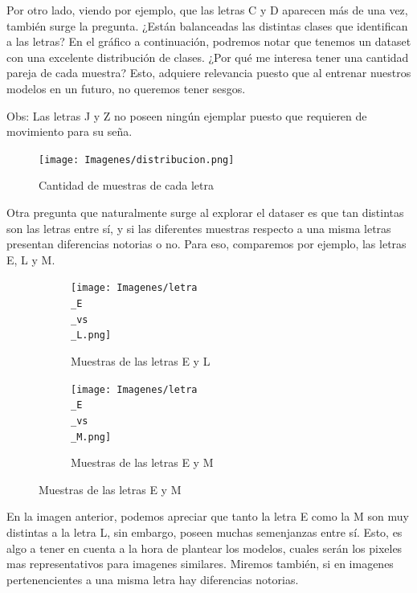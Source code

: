 \documentclass[10pt,a4paper]{article}
\begin{document}
Por otro lado, viendo por ejemplo, que las letras C y D aparecen más de una vez, también surge la pregunta. ¿Están balanceadas las distintas clases que identifican a las letras? En el gráfico a continuación, podremos notar que tenemos un dataset con una excelente distribución de clases. ¿Por qué me interesa
tener una cantidad pareja de cada muestra? Esto, adquiere relevancia puesto que al entrenar nuestros modelos en un futuro, no queremos tener sesgos.
\vspace{0.05cm}
  
Obs: Las letras J y Z no poseen ningún ejemplar puesto que requieren de movimiento para su seña.

\vspace{0.1cm}

\begin{figure}[h]
  \centering
  \texttt{[image: Imagenes/distribucion.png]}
  \caption{Cantidad de muestras de cada letra}
  \label{fig:Tabla 2}
\end{figure}

\newpage

Otra pregunta que naturalmente surge al explorar el dataser es que tan distintas son las letras entre sí, y si las diferentes muestras respecto a una misma letras
presentan diferencias notorias o no. Para eso, comparemos por ejemplo, las letras E, L y M.

\begin{figure}[ht!]
	\begin{subfigure}{0.5\textwidth}
		\texttt{[image: Imagenes/letra\\\_E\\\_vs\\\_L.png]} 
		\caption{Muestras de las letras E y L}
		\label{fig:subfig1}
	\end{subfigure}
	\begin{subfigure}{0.5\textwidth}
		\texttt{[image: Imagenes/letra\\\_E\\\_vs\\\_M.png]}
		\caption{Muestras de las letras E y M}
		\label{fig:subfig2}
	\end{subfigure}
	\label{fig:subfigs}
\end{figure}

En la imagen anterior, podemos apreciar que tanto la letra E como la M son muy distintas a la letra L, sin embargo, poseen muchas semenjanzas entre sí. Esto, es algo a tener en cuenta a la hora de plantear los modelos, cuales serán los pixeles mas representativos para imagenes similares.
Miremos también, si en imagenes pertenencientes a una misma letra hay diferencias notorias. 
\end{document}
